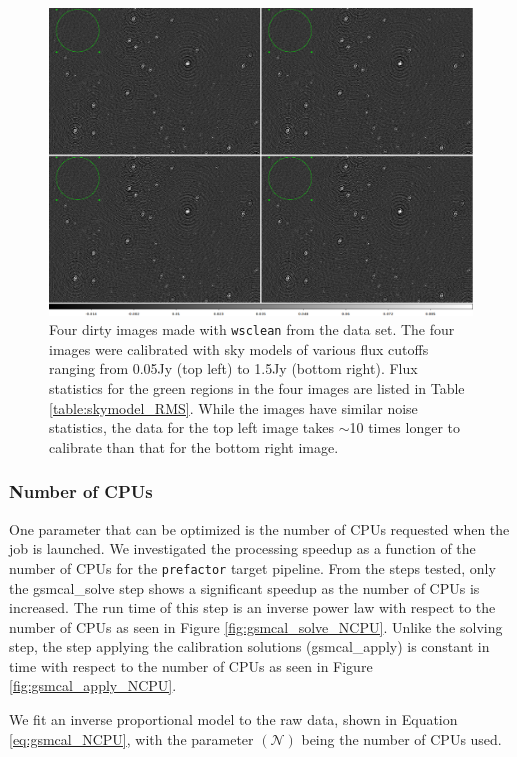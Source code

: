 \documentclass[preprint,5p]{elsarticle}
\begin{document}
\begin{figure}
    \includegraphics[width=0.95\linewidth]{figures/skymodel_images.png}
      \caption{Four dirty images made with \texttt{wsclean} from the data set. The four images were calibrated with sky models of various flux cutoffs ranging from 0.05Jy (top left) to 1.5Jy (bottom right). Flux statistics for the green regions in the four images are listed in Table \ref{table:skymodel_RMS}. While the images have similar noise statistics, the data for the top left image takes $\sim$10 times longer to calibrate than that for the bottom right image. }
	\label{fig:skymodel_images}
\end{figure}

\subsubsection{Number of CPUs}
One parameter that can be optimized is the number of CPUs requested when the job is launched. We investigated the processing speedup as a function of the number of CPUs for the \texttt{prefactor} target pipeline. From the steps tested, only the gsmcal\_solve step shows a significant speedup as the number of CPUs is increased. The run time of this step is an inverse power law with respect to the number of CPUs as seen in Figure \ref{fig:gsmcal_solve_NCPU}. Unlike the solving step, the step applying the calibration solutions (gsmcal\_apply) is constant in time with respect to the number of CPUs as seen in Figure \ref{fig:gsmcal_apply_NCPU}. 

We fit an inverse proportional model to the raw data, shown in Equation \ref{eq:gsmcal_NCPU}, with the parameter $(\mathcal{N})$ being the number of CPUs used. 
\end{document}
